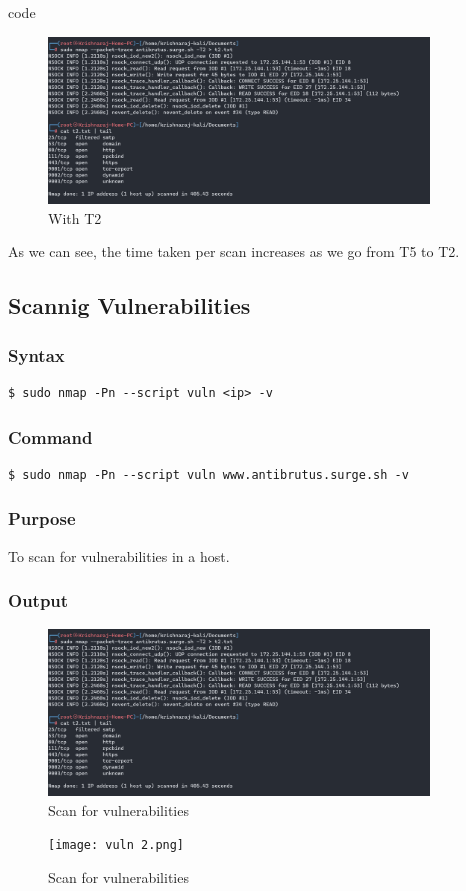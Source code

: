 code \documentclass[11pt]{article}
\begin{document}
\begin{figure}[H]
    \centering
    \includegraphics[width=0.9\textwidth]{t2.png}
    \caption{With T2}
    \label{fig:1}
\end{figure}

As we can see, the time taken per scan increases as we go from T5 to T2.


\subsection{Scannig Vulnerabilities}
\subsubsection{Syntax}
\begin{verbatim}
$ sudo nmap -Pn --script vuln <ip> -v
\end{verbatim}

\subsubsection*{Command}
\begin{verbatim}
$ sudo nmap -Pn --script vuln www.antibrutus.surge.sh -v
\end{verbatim}

\subsubsection*{Purpose}
To scan for vulnerabilities in a host.

\subsubsection*{Output}
\begin{figure}[H]
    \centering
    \includegraphics[width=0.9\textwidth]{vuln.png}
    \caption{Scan for vulnerabilities}
    \label{fig:1}
\end{figure}
\begin{figure}[H]
    \centering
    \texttt{[image: vuln 2.png]}
    \caption{Scan for vulnerabilities}
    \label{fig:1}
\end{figure}
\end{document}
